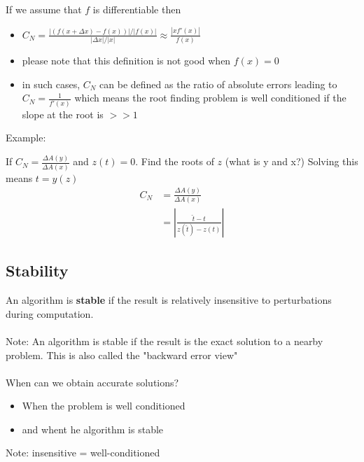 \documentclass[12pt]{article}
\begin{document}
If we assume that $f$ is differentiable then

\begin{itemize}
    \item $C_N = \frac{|(f(x + \Delta x) - f(x))| / |f(x)|}{|
    \Delta x|/ |x|} \approx \frac{|xf'(x)|}{f(x)}$
    \item please note that this definition is not good when $f(x) = 0$
    \item in such cases, $C_N$ can be defined as the ratio of absolute errors leading to $C_N = \frac{1}{f'(x)}$ which means the root finding problem is well conditioned if the slope at the root is $>>1$
\end{itemize}

Example:

If $C_N = \frac{\Delta A (y)}{ \Delta A (x)}$ and $z(t) = 0$. Find the roots of $z$ (what is y and x?)
Solving this means $t = y(z)$
\begin{align*}
    C_N &= \frac{\Delta A (y)}{ \Delta A (x)}\\
    &= |\frac{\hat{t} - t}{z(\hat{t}) - z(t)}|
\end{align*}

\subsection{Stability}

An algorithm is \textbf{stable} if the result is relatively insensitive to perturbations during computation.
\\
\\
Note: An algorithm is stable if the result is the exact solution to a nearby problem. This is also called the "backward error view"
\\
\\
When can we obtain accurate solutions?
\begin{itemize}
    \item When the problem is well conditioned
    \item and whent he algorithm is stable
\end{itemize}

Note: insensitive = well-conditioned
\end{document}
